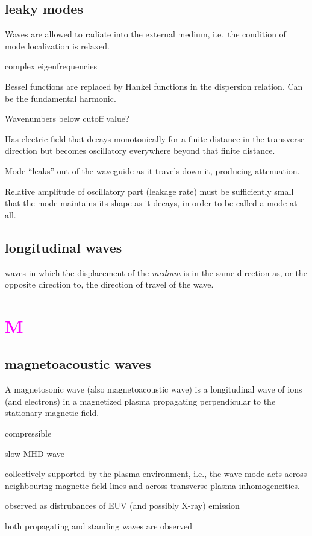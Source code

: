 \documentclass[12pt]{article}
\begin{document}
\subsection*{leaky modes}
\begin{itemize*}
    \item Waves are allowed to radiate into the external medium,
        i.e.\ the condition of mode localization is relaxed.
    \item complex eigenfrequencies
    \item Bessel functions are replaced by Hankel functions in the
        dispersion relation. Can be the fundamental harmonic.
    \item Wavenumbers below cutoff value?
    \item Has electric field that decays monotonically for a finite
        distance in the transverse direction but becomes oscillatory
        everywhere beyond that finite distance.
    \item Mode ``leaks'' out of
        the waveguide as it travels down it, producing attenuation.
    \item Relative amplitude of oscillatory part (leakage rate)
        must be sufficiently small that the mode maintains its
        shape as it decays, in order to be called a mode at all.
\end{itemize*}

\subsection*{longitudinal waves}
waves in which the displacement of the \emph{medium} is in the
same direction as, or the opposite direction to,
the direction of travel of the wave.

\section*{\textcolor{magenta}{M}}
\subsection*{magnetoacoustic waves}
\begin{itemize*}
    \item A magnetosonic wave (also magnetoacoustic wave) is a
        longitudinal wave of ions (and electrons) in a magnetized
        plasma propagating perpendicular to the stationary magnetic field.
    \item compressible
    \item slow MHD wave
    \item collectively supported by the plasma environment, i.e., the wave mode acts
        across neighbouring magnetic field lines and across transverse
        plasma inhomogeneities.
    \item observed as distrubances of EUV (and possibly X-ray) emission
    \item both propagating and standing waves are observed
\end{itemize*}
\end{document}
